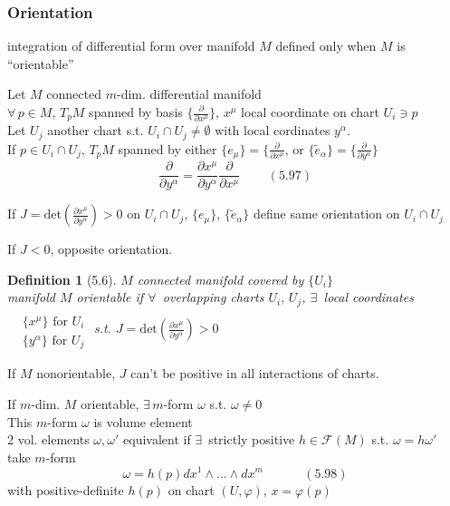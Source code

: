 \documentclass[twoside]{amsart}
\newtheorem{definition}{Definition}
\begin{document}
\subsubsection{ Orientation }

integration of differential form over manifold $M$ defined only when $M$ is ``orientable''

Let $M$ connected $m$-dim. differential manifold \\
$\forall \, p \in M$, $T_pM$ spanned by basis $\lbrace \frac{ \partial }{ \partial x^{\mu} } \rbrace$, $x^{\mu}$ local coordinate on chart $U_i \ni p$ \\
Let $U_j$ another chart s.t. $U_i \cap U_j \neq \emptyset$ with local cordinates $y^{\alpha}$. \\
If $p \in U_i \cap U_j$, $T_pM$ spanned by either $\lbrace e_{\mu} \rbrace = \lbrace \frac{ \partial }{ \partial x^{\mu} }$, or $\lbrace \widetilde{e}_{\alpha} \rbrace = \lbrace \frac{ \partial }{ \partial y^{\alpha} } \rbrace$
\begin{equation}
  \frac{ \partial }{ \partial y^{\alpha} } = \frac{ \partial x^{\mu} }{ \partial y^{\alpha}} \frac{ \partial }{ \partial x^{\mu} } \quad \quad \, (5.97)
\end{equation}

If $J = \text{det}{ \left( \frac{ \partial x^{\mu} }{ \partial y^{\alpha}} \right)} >0$ on $U_i \cap U_j$, $\lbrace e_{\mu} \rbrace$, $\lbrace \widetilde{e}_{\alpha} \rbrace$ define same orientation on $U_i \cap U_j$

If $J <0$, opposite orientation.  



\begin{definition}[5.6]
$M$ connected manifold covered by $\lbrace U_i \rbrace$ \\
manifold $M$ orientable if $\forall \, $ overlapping charts $U_i, \, U_j$, $\exists \, $ local coordinates $\begin{aligned} & \quad \\
  & \lbrace x^{\mu} \rbrace \text{ for } U_i \\ 
  & \lbrace y^{\alpha} \rbrace \text{ for } U_j \end{aligned}$ s.t. $J = \text{det}{ \left( \frac{ \partial x^{\mu} }{ \partial y^{\alpha}} \right) } > 0$
\end{definition}

If $M$ nonorientable, $J$ can't be positive in all interactions of charts.  

If $m$-dim. $M$ orientable, $\exists \, m$-form $\omega$ s.t. $\omega\neq 0$ \\
This $m$-form $\omega$ is volume element \\
2 vol. elements $\omega, \omega'$ equivalent if $\exists \, $ strictly positive $h \in \mathcal{F}(M)$ s.t. $\omega = h\omega'$ \\
take $m$-form
\begin{equation}
  \omega = h(p) dx^1 \wedge \dots \wedge dx^m \quad \quad \quad \, (5.98)
\end{equation}
with positive-definite $h(p)$ on chart $(U,\varphi)$, $x = \varphi(p)$
\end{document}
